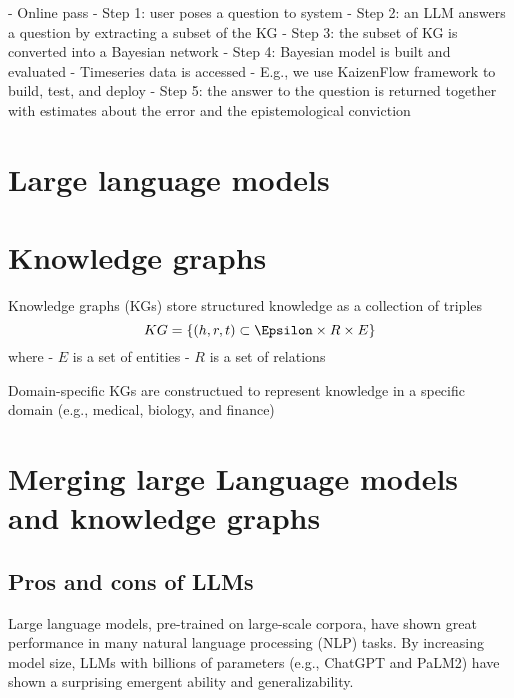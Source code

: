 \documentclass[11pt, reqno]{amsart}
\theoremstyle{definition}
\theoremstyle{remark}
\begin{document}
    - Online pass
      - Step 1: user poses a question to system
      - Step 2: an LLM answers a question by extracting a subset of the KG
      - Step 3: the subset of KG is converted into a Bayesian network
      - Step 4: Bayesian model is built and evaluated
        - Timeseries data is accessed
        - E.g., we use KaizenFlow framework to build, test, and deploy
      - Step 5: the answer to the question is returned together with estimates
        about the error and the epistemological conviction

	\section{Large language models}

	\section{Knowledge graphs}

    Knowledge graphs (KGs) store structured knowledge as a collection of triples
    $$KG = \{(h, r, t) \subset \Epsilon \times R \times E\}$$
    where
    - $E$ is a set of entities
    - $R$ is a set of relations

    Domain-specific KGs are constructued to represent knowledge in a specific
    domain (e.g., medical, biology, and finance)


	\section{Merging large Language models and knowledge graphs}

    \subsection{Pros and cons of LLMs}

    Large language models, pre-trained on large-scale corpora, have shown great
    performance in many natural language processing (NLP) tasks. By increasing
    model size, LLMs with billions of parameters (e.g., ChatGPT and PaLM2) have
    shown a surprising emergent ability and generalizability.
\end{document}
